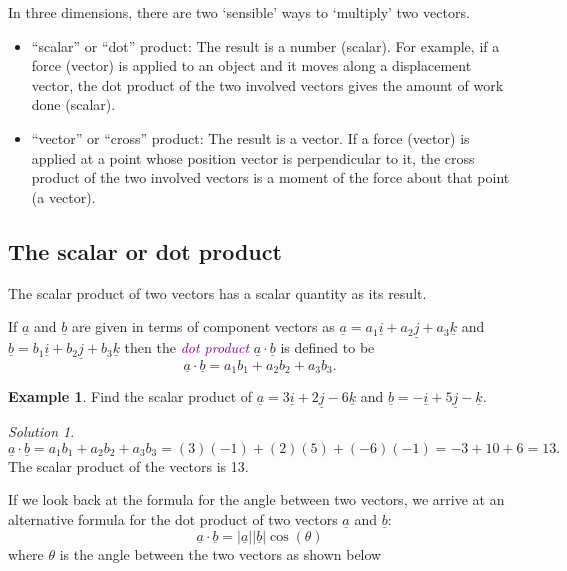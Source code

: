 \documentclass[
  english,
  11pt,
  oneside]{book}
\newcommand{\slide}{}
\theoremstyle{definition}
\theoremstyle{definition}
\newtheorem{example}{Example}[chapter]
\theoremstyle{definition}
\theoremstyle{definition}
\theoremstyle{remark}
\newtheorem*{solution}{Solution}
\begin{document}
In three dimensions, there are two `sensible' ways to `multiply' two vectors.

\begin{itemize}
\item
  ``scalar'' or ``dot'' product: The result is a number (scalar). For example, if a force (vector) is applied to an object and it moves along a displacement vector, the dot product of the two involved vectors gives the amount of work done (scalar).
\item
  ``vector'' or ``cross'' product: The result is a vector. If a force (vector) is applied at a point whose position vector is perpendicular to it, the cross product of the two involved vectors is a moment of the force about that point (a vector).
\end{itemize}

\slide

\subsection{The scalar or dot product}\label{the-scalar-or-dot-product}

The scalar product of two vectors has a scalar quantity as its result.

If \(\underline a\) and \(\underline b\) are given in terms of component vectors as \(\underline a = a_1\underline i + a_2\underline j + a_3\underline k\) and \(\underline b = b_1\underline i + b_2\underline j + b_3\underline k\) then the \textcolor{purple}{\em dot product} \(\underline{a}\cdot \underline{b}\) is defined to be
\[\underline a \cdot\underline b = a_1b_1 + a_2b_2 + a_3b_3.\]
\slide

\begin{example}
Find the scalar product of \(\underline a = 3\underline i + 2\underline j - 6\underline k\) and \(\underline b = -\underline i + 5\underline j - \underline k\).
\end{example}

\begin{solution}
\[\underline a\cdot\underline b = a_1b_1 + a_2b_2 + a_3b_3 = (3)(-1)+(2)(5)+(-6)(-1) = -3+10+6=13.\]
The scalar product of the vectors is 13.
\end{solution}

\slide

If we look back at the formula for the angle between two vectors, we arrive at an alternative formula for the dot product of two vectors \(\underline a\) and \(\underline b\):
\[\underline a \cdot\underline b = |\underline a||\underline b|\cos(\theta)\]
where \(\theta\) is the angle between the two vectors as shown below
\end{document}
